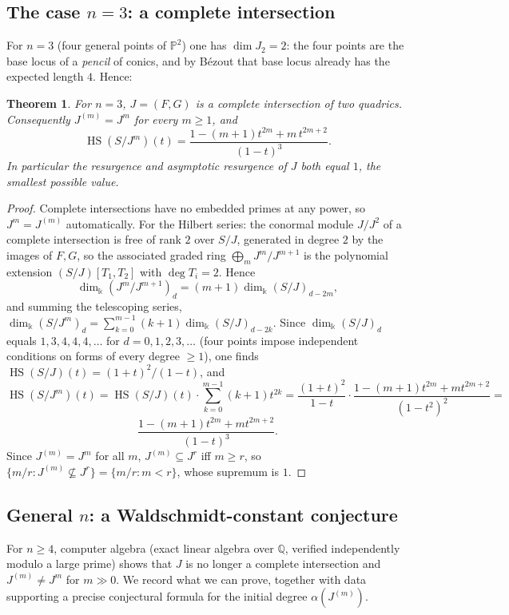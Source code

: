 \documentclass[11pt]{article}
\newtheorem{theorem}{Theorem}[section]
\newcommand{\PP}{\mathbb P}
\newcommand{\HS}{\operatorname{HS}}
\begin{document}
\subsection{The case \(n=3\): a complete intersection}

For \(n=3\) (four general points of \(\PP^2\)) one has
\(\dim J_2=2\): the four points are the base locus of a \emph{pencil}
of conics, and by B\'ezout that base locus already has the expected
length \(4\).  Hence:

\begin{theorem}\label{thm:n3-CI}
For \(n=3\), \(J=(F,G)\) is a complete intersection of two quadrics.
Consequently \(J^{(m)}=J^m\) for every \(m\ge1\), and
\[
 \HS(S/J^m)(t)=\frac{1-(m+1)t^{2m}+m\,t^{2m+2}}{(1-t)^3}.
\]
In particular the resurgence and asymptotic resurgence of \(J\) both
equal \(1\), the smallest possible value.
\end{theorem}

\begin{proof}
Complete intersections have no embedded primes at any power, so
\(J^m=J^{(m)}\) automatically.  For the Hilbert series: the conormal
module \(J/J^2\) of a complete intersection is free of rank \(2\)
over \(S/J\), generated in degree \(2\) by the images of \(F,G\), so
the associated graded ring \(\bigoplus_mJ^m/J^{m+1}\) is the
polynomial extension \((S/J)[T_1,T_2]\) with \(\deg T_i=2\).  Hence
\[
 \dim_\Bbbk(J^m/J^{m+1})_d=(m+1)\dim_\Bbbk(S/J)_{d-2m},
\]
and summing the telescoping series,
\(\dim_\Bbbk(S/J^m)_d=\sum_{k=0}^{m-1}(k+1)\dim_\Bbbk(S/J)_{d-2k}\).
Since \(\dim_\Bbbk(S/J)_d\) equals \(1,3,4,4,4,\dots\) for
\(d=0,1,2,3,\dots\) (four points impose independent conditions on
forms of every degree \(\ge1\)), one finds
\(\HS(S/J)(t)=(1+t)^2/(1-t)\), and
\[
 \HS(S/J^m)(t)
 =\HS(S/J)(t)\cdot\sum_{k=0}^{m-1}(k+1)t^{2k}
 =\frac{(1+t)^2}{1-t}\cdot\frac{1-(m+1)t^{2m}+mt^{2m+2}}{(1-t^2)^2}=\]
 \[\frac{1-(m+1)t^{2m}+mt^{2m+2}}{(1-t)^3}.
\]
Since \(J^{(m)}=J^m\) for all \(m\), \(J^{(m)}\subseteq J^r\) iff
\(m\ge r\), so \(\{m/r:J^{(m)}\not\subseteq J^r\}=\{m/r:m<r\}\), whose
supremum is \(1\).
\end{proof}

\subsection{General \(n\): a Waldschmidt-constant conjecture}

For \(n\ge4\), computer algebra (exact linear algebra over
\(\mathbb Q\), verified independently modulo a large prime) shows that
\(J\) is no longer a complete intersection and \(J^{(m)}\ne J^m\) for
\(m\gg0\).  We record what we can prove, together with data
supporting a precise conjectural formula for the initial degree
\(\alpha(J^{(m)})\).
\end{document}
